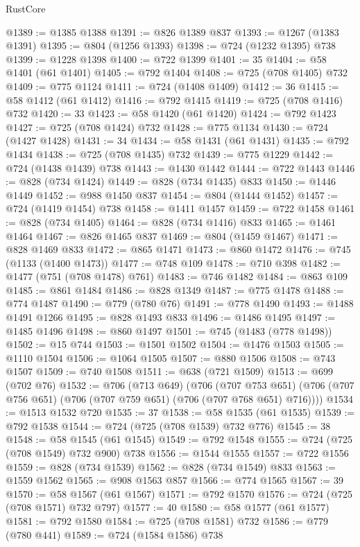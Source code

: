 \begin{lexlean}{RustCore}
\begin{coremodule}
@1389 := @1385 @1388
@1391 := @826 @1389 @837
@1393 := @1267 (@1383 @1391)
@1395 := @804 (@1256 @1393)
@1398 := @724 (@1232 @1395) @738
@1399 := @1228 @1398
@1400 := @722 @1399
@1401 := 35
@1404 := @58 @1401 (@61 @1401)
@1405 := @792 @1404
@1408 := @725 (@708 @1405) @732
@1409 := @775 @1124
@1411 := @724 (@1408 @1409)
@1412 := 36
@1415 := @58 @1412 (@61 @1412)
@1416 := @792 @1415
@1419 := @725 (@708 @1416) @732
@1420 := 33
@1423 := @58 @1420 (@61 @1420)
@1424 := @792 @1423
@1427 := @725 (@708 @1424) @732
@1428 := @775 @1134
@1430 := @724 (@1427 @1428)
@1431 := 34
@1434 := @58 @1431 (@61 @1431)
@1435 := @792 @1434
@1438 := @725 (@708 @1435) @732
@1439 := @775 @1229
@1442 := @724 (@1438 @1439) @738
@1443 := @1430 @1442
@1444 := @722 @1443
@1446 := @828 (@734 @1424)
@1449 := @828 (@734 @1435) @833
@1450 := @1446 @1449
@1452 := @988 @1450 @837
@1454 := @804 (@1444 @1452)
@1457 := @724 (@1419 @1454) @738
@1458 := @1411 @1457
@1459 := @722 @1458
@1461 := @828 (@734 @1405)
@1464 := @828 (@734 @1416) @833
@1465 := @1461 @1464
@1467 := @826 @1465 @837
@1469 := @804 (@1459 @1467)
@1471 := @828 @1469 @833
@1472 := @865 @1471
@1473 := @860 @1472
@1476 := @745 (@1133 (@1400 @1473))
@1477 := @748 @109
@1478 := @710 @398
@1482 := @1477 (@751 (@708 @1478) @761)
@1483 := @746 @1482
@1484 := @863 @109
@1485 := @861 @1484
@1486 := @828 @1349
@1487 := @775 @1478
@1488 := @774 @1487
@1490 := @779 (@780 @76)
@1491 := @778 @1490
@1493 := @1488 @1491 @1266
@1495 := @828 @1493 @833
@1496 := @1486 @1495
@1497 := @1485 @1496
@1498 := @860 @1497
@1501 := @745 (@1483 (@778 @1498))
@1502 := @15 @744
@1503 := @1501 @1502
@1504 := @1476 @1503
@1505 := @1110 @1504
@1506 := @1064 @1505
@1507 := @880 @1506
@1508 := @743 @1507
@1509 := @740 @1508
@1511 := @638 (@721 @1509)
@1513 := @699 (@702 @76)
@1532 := @706
    (@713 @649)
    (@706
      (@707 @753 @651)
      (@706 (@707 @756 @651) (@706 (@707 @759 @651) (@706 (@707 @768 @651) @716))))
@1534 := @1513 @1532 @720
@1535 := 37
@1538 := @58 @1535 (@61 @1535)
@1539 := @792 @1538
@1544 := @724 (@725 (@708 @1539) @732 @776)
@1545 := 38
@1548 := @58 @1545 (@61 @1545)
@1549 := @792 @1548
@1555 := @724 (@725 (@708 @1549) @732 @900) @738
@1556 := @1544 @1555
@1557 := @722 @1556
@1559 := @828 (@734 @1539)
@1562 := @828 (@734 @1549) @833
@1563 := @1559 @1562
@1565 := @908 @1563 @857
@1566 := @774 @1565
@1567 := 39
@1570 := @58 @1567 (@61 @1567)
@1571 := @792 @1570
@1576 := @724 (@725 (@708 @1571) @732 @797)
@1577 := 40
@1580 := @58 @1577 (@61 @1577)
@1581 := @792 @1580
@1584 := @725 (@708 @1581) @732
@1586 := @779 (@780 @441)
@1589 := @724 (@1584 @1586) @738

\end{coremodule}
\end{lexlean}
